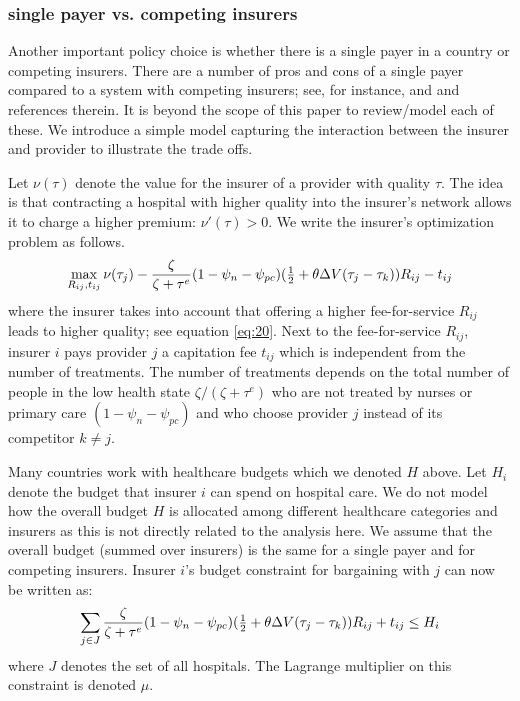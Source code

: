 \documentclass[a4paper,12pt]{article}
\begin{document}
\subsubsection{single payer vs. competing insurers}
\label{sec:org2cdbe79}

Another important policy choice is whether there is a single payer in a country or competing insurers. There are a number of pros and cons of a single payer compared to a system with competing insurers; see, for instance, \cite{OberlanderSinglePayer} and \cite{BICHAY2020113454} and references therein. It is beyond the scope of this paper to review/model each of these. We introduce a simple model capturing the interaction between the insurer and provider to illustrate the trade offs.

Let \(\nu(\tau)\) denote the value for the insurer of a provider with quality \(\tau\). The idea is that contracting a hospital with higher quality into the insurer's network allows it to charge a higher premium: \(\nu'(\tau) > 0\). We write the insurer's optimization problem as follows.
\begin{equation}
\label{eq:36a}
\max_{R_{ij},t_{ij}} \nu(\tau_j) - \frac{\zeta}{\zeta+\tau^e}(1-\psi_n-\psi_{pc}) (\textstyle{1\over 2}+\theta\Delta V(\tau_j-\tau_k) )R_{ij} - t_{ij}
\end{equation}
where the insurer takes into account that offering a higher fee-for-service \(R_{ij}\) leads to higher quality; see equation \eqref{eq:20}. Next to the fee-for-service \(R_{ij}\), insurer \(i\) pays provider \(j\) a capitation fee \(t_{ij}\) which is independent from the number of treatments. The number of treatments depends on the total number of people in the low health state \(\zeta/(\zeta+\tau^e)\) who are not treated by nurses or primary care \((1-\psi_n-\psi_{pc})\) and who choose provider \(j\) instead of its competitor \(k \neq j\).

Many countries work with healthcare budgets which we denoted \(H\) above. Let \(H_i\) denote the budget that insurer \(i\) can spend on hospital care. We do not model how the overall budget \(H\) is allocated among different healthcare categories and insurers as this is not directly related to the analysis here. We assume that the overall budget (summed over insurers) is the same for a single payer and for competing insurers. Insurer \(i\)'s budget constraint for bargaining with \(j\) can now be written as:
\begin{equation}
\label{eq:35}
\sum_{j \in J} \frac{\zeta}{\zeta+\tau^e}(1-\psi_n-\psi_{pc}) (\textstyle{1\over 2}+\theta\Delta V(\tau_j-\tau_k) )R_{ij} + t_{ij} \leq H_i
\end{equation}
where \(J\) denotes the set of all hospitals. The Lagrange multiplier on this constraint is denoted \(\mu\).
\end{document}
